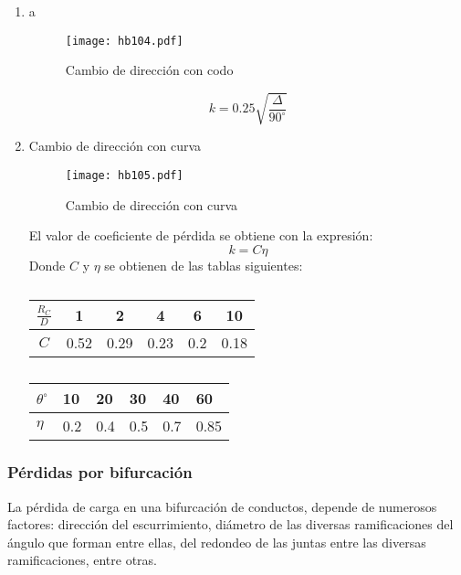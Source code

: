 \begin{enumerate}
    \item a
    \begin{figure}[h!]
    \centering
      \texttt{[image: hb104.pdf]}
      \caption{Cambio de dirección con codo}
      \label{hb104}
    \end{figure}
    \begin{equation}
        k = 0.25\sqrt{\frac{\Delta}{90^{\circ}}}
    \end{equation}
    \item Cambio de dirección con curva
    \begin{figure}[h!]
    \centering
      \texttt{[image: hb105.pdf]}
      \caption{Cambio de dirección con curva}
      \label{hb105}
    \end{figure}
    El valor de coeficiente de pérdida se obtiene con la expresión:
    \begin{equation}
        k = C\eta
    \end{equation}
    Donde $C$ y $\eta$ se obtienen de las tablas siguientes:
    \begin{table}[h!]
        \centering
        \begin{tabular}{@{}cccccc@{}}
        \toprule
        $\frac{R_C}{D}$ & 1    & 2    & 4    & 6   & 10   \\ \midrule
        $C$             & 0.52 & 0.29 & 0.23 & 0.2 & 0.18 \\ \bottomrule
        \end{tabular}
        \caption{}
        \label{tabhb17}
        \end{table}
        \begin{table}[h!]
            \centering
            \begin{tabular}{@{}llllll@{}}
            \toprule
            $\theta^{\circ}$ & 10  & 20  & 30  & 40  & 60   \\ \midrule
            $\eta$           & 0.2 & 0.4 & 0.5 & 0.7 & 0.85 \\ \bottomrule
            \end{tabular}
            \caption{}
            \label{tabhb18}
            \end{table}
\end{enumerate}

\subsubsection{Pérdidas por bifurcación}
La pérdida de carga en una bifurcación de conductos, depende de numerosos factores: dirección del escurrimiento, diámetro de las diversas ramificaciones del ángulo que forman entre ellas, del redondeo de las juntas entre las diversas ramificaciones, entre otras.

